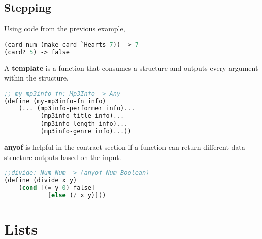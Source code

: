 \documentclass[english, 12pt]{article}
\begin{document}
\subsection{Stepping}
Using code from the previous example,
\begin{lstlisting}[language=Scheme]
(card-num (make-card `Hearts 7)) -> 7
(card? 5) -> false
\end{lstlisting}
\begin{defn}
A \textbf{template} is a function that consumes a structure and outputs every argument within the structure.
\begin{lstlisting}[language=Scheme]
;; my-mp3info-fn: Mp3Info -> Any
(define (my-mp3info-fn info)
	(... (mp3info-performer info)...
		  (mp3info-title info)...
		  (mp3info-length info)...
		  (mp3info-genre info)...))
\end{lstlisting}
\end{defn}
\begin{defn}
\textbf{anyof} is helpful in the contract section if a function can return different data structure outputs based on the input. 
\begin{lstlisting}[language=Scheme]
;;divide: Num Num -> (anyof Num Boolean)
(define (divide x y) 
	(cond [(= y 0) false]
		  	[else (/ x y)])) 

\end{lstlisting}
\end{defn}
\section{Lists}
\end{document}
